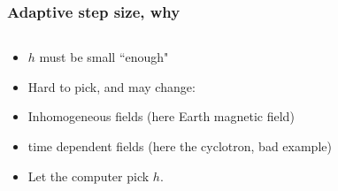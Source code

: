 \documentclass{beamer}
\begin{document}
\begin{frame}
\frametitle{Adaptive step size, why}



\begin{columns}
\begin{column}{0.5\linewidth}
\begin{itemize}
\item <1-> $h$ must be small ``enough"

\item <2-> Hard to pick, and may change:

\item <3-> Inhomogeneous fields (here Earth magnetic field)

\item <4-> time dependent fields (here the cyclotron, bad example)

\item <5-> Let the computer pick $h$.

\end{itemize}
\end{column}
\begin{column}{0.5\linewidth}


\end{column}
\end{columns}
\end{frame}
\end{document}
